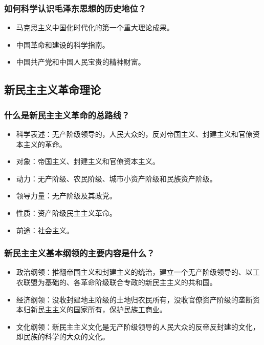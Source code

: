 \documentclass{article}
\begin{document}
\subsubsection{如何科学认识毛泽东思想的历史地位？}
\begin{itemize}
    \item 马克思主义中国化时代化的第一个重大理论成果。
    \item 中国革命和建设的科学指南。
    \item 中国共产党和中国人民宝贵的精神财富。
\end{itemize}
    
\subsection{新民主主义革命理论}

\subsubsection{什么是新民主主义革命的总路线？}
\begin{itemize}
    \item 科学表述：无产阶级领导的，人民大众的，反对帝国主义、封建主义和官僚资本主义的革命。
    \item 对象：帝国主义、封建主义和官僚资本主义。
    \item 动力：无产阶级、农民阶级、城市小资产阶级和民族资产阶级。
    \item 领导力量：无产阶级及其政党。
    \item 性质：资产阶级民主主义革命。
    \item 前途：社会主义。
\end{itemize}
    
\subsubsection{新民主主义基本纲领的主要内容是什么？}
\begin{itemize}
    \item 政治纲领：推翻帝国主义和封建主义的统治，建立一个无产阶级领导的、以工农联盟为基础的、各革命阶级联合专政的新民主主义的共和国。
    \item 经济纲领：没收封建地主阶级的土地归农民所有，没收官僚资产阶级的垄断资本归新民主主义的国家所有，保护民族工商业。
    \item 文化纲领：新民主主义文化是无产阶级领导的人民大众的反帝反封建的文化，即民族的科学的大众的文化。
\end{itemize}
\end{document}
